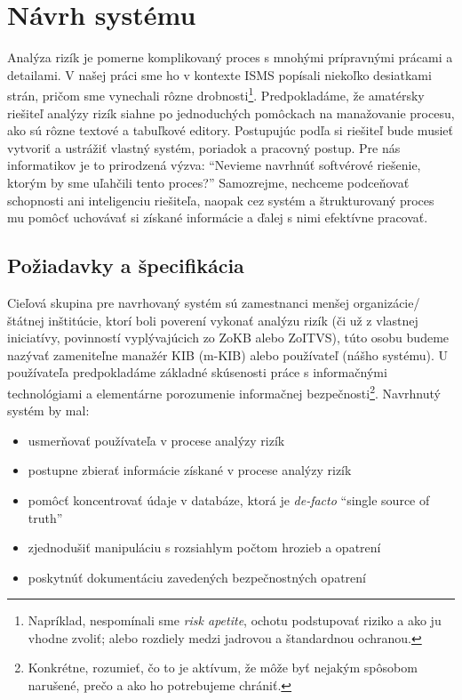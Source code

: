 \chapter{Návrh systému}
\label{chap:application}

Analýza rizík je pomerne komplikovaný proces s mnohými prípravnými prácami a detailami. V našej práci sme ho v kontexte ISMS
popísali niekoľko desiatkami strán, pričom sme vynechali rôzne drobnosti\footnote{Napríklad, nespomínali sme \emph{risk apetite},
ochotu podstupovať riziko a ako ju vhodne zvoliť; alebo rozdiely medzi jadrovou a štandardnou ochranou.}. 
Predpokladáme, že amatérsky riešiteľ analýzy rizík siahne po jednoduchých pomôckach na manažovanie procesu, ako sú rôzne textové a
tabuľkové editory. Postupujúc podľa \cite{BSI3} si riešiteľ bude musieť vytvoriť a ustrážiť vlastný systém, poriadok a pracovný
postup. Pre nás informatikov je to prirodzená výzva: \enquote{Nevieme navrhnúť softvérové riešenie, ktorým by sme uľahčili tento proces?}
Samozrejme, nechceme podceňovať schopnosti ani inteligenciu riešiteľa, naopak cez systém a štrukturovaný proces mu pomôcť uchovávať
si získané informácie a ďalej s nimi efektívne pracovať.

\section{Požiadavky a špecifikácia}

Cieľová skupina pre navrhovaný systém sú zamestnanci menšej organizácie/štátnej inštitúcie, ktorí boli poverení vykonať analýzu rizík
(či už z vlastnej iniciatívy, povinností vyplývajúcich zo ZoKB alebo ZoITVS), túto osobu budeme nazývať zameniteľne manažér KIB (m-KIB)
alebo používateľ (nášho systému). U používateľa predpokladáme základné skúsenosti práce s informačnými technológiami a elementárne porozumenie
informačnej bezpečnosti\footnote{Konkrétne, rozumieť, čo to je aktívum, že môže byť nejakým spôsobom narušené, prečo a ako ho potrebujeme
chrániť.}. Navrhnutý systém by mal:
\begin{itemize}[nosep]
    \item usmerňovať používateľa v procese analýzy rizík
    \item postupne zbierať informácie získané v procese analýzy rizík
    \item pomôcť koncentrovať údaje v databáze, ktorá je \emph{de-facto} \enquote{single source of truth}
    \item zjednodušiť manipuláciu s rozsiahlym počtom hrozieb a opatrení \cite{GSK} 
    \item poskytnúť dokumentáciu zavedených bezpečnostných opatrení
\end{itemize}

